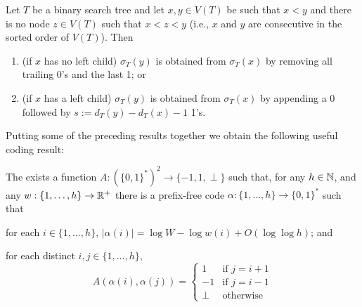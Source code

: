 \documentclass[kpfonts]{patmorin}
\begin{document}
\begin{lem}
  Let $T$ be a binary search tree and let $x,y\in V(T)$ be such that $x<y$ and there is no node $z\in V(T)$ such that $x<z<y$ (i.e., $x$ and $y$ are consecutive in the sorted order of $V(T)$).  Then
  \begin{enumerate}
    \item (if $x$ has no left child) $\sigma_T(y)$ is obtained from $\sigma_T(x)$ by removing all trailing 0's and the last 1; or
    \item (if $x$ has a left child) $\sigma_T(y)$ is obtained from $\sigma_T(x)$ by appending a 0 followed by $s:=d_T(y)-d_T(x)-1$ 1's.
  \end{enumerate}
\end{lem}

Putting some of the preceding results together we obtain the following useful coding result:

\begin{lem}
  The exists a function $A:(\{0,1\}^*)^2\to\{-1,1,\perp\}$ such that, for any $h\in\mathbb{N}$, and any $w:\{1,\ldots,h\}\to\mathbb{R}^+$ there is a prefix-free code $\alpha:\{1,\ldots,h\}\to \{0,1\}^*$ such that 
  \begin{compactenum}
    \item for each $i\in\{1,\ldots,h\}$, $|\alpha(i)|=\log W -\log w(i) + O(\log\log h)$; and
    \item for each distinct $i,j\in\{1,\ldots,h\}$, 
    \[   A(\alpha(i),\alpha(j)) 
    = \begin{cases}
       1 & \text{if $j=i+1$} \\
       -1 & \text{if $j=i-1$} \\
       \perp & \text{otherwise}
      \end{cases}
      \]
    \end{compactenum}
\end{lem}
\end{document}
